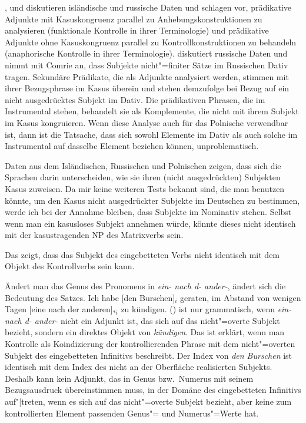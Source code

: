{%
% 
        \citet{Andrews82b}, \citet{Neidle82a} und 
        \citet[]{Bresnan82c} diskutieren isländische und
        russische Daten und schlagen vor, prädikative Adjunkte mit Kasuskongruenz
        parallel zu Anhebungskonstruktionen zu analysieren (funktionale Kontrolle
        in ihrer Terminologie) und prädikative Adjunkte ohne Kasuskongruenz parallel zu
        Kontrollkonstruktionen zu behandeln (anaphorische Kontrolle
        in ihrer Terminologie).
        \citet[]{Neidle82a} diskutiert russische Daten und nimmt mit Comrie
        an, dass Subjekte nicht"=finiter Sätze im Russischen Dativ tragen. Sekundäre Prädikate,
        die als Adjunkte analysiert werden, stimmen mit ihrer Bezugsphrase im Kasus überein und
        stehen demzufolge bei Bezug auf ein nicht ausgedrücktes Subjekt im Dativ. Die prädikativen
        Phrasen, die im Instrumental stehen, behandelt sie als Komplemente, die nicht mit
        ihrem Subjekt im Kasus kongruieren. Wenn diese Analyse auch für das Polnische verwendbar
        ist, dann ist die Tatsache, dass sich sowohl Elemente im Dativ als auch solche im Instrumental
        auf dasselbe Element beziehen können, unproblematisch.

        Daten aus dem Isländischen, Russischen und Polnischen zeigen, dass sich die Sprachen darin unterscheiden, wie sie
        ihren (nicht ausgedrückten) Subjekten Kasus zuweisen. Da mir keine weiteren
        Tests bekannt sind, die man benutzen könnte, um den Kasus nicht ausgedrückter Subjekte
        im Deutschen zu bestimmen, werde ich bei der Annahme bleiben, dass Subjekte im Nominativ
        stehen.
        Selbst wenn man ein kasusloses Subjekt annehmen würde, könnte dieses nicht identisch
        mit der kasustragenden NP des Matrixverbs sein.
}
Das zeigt, dass das Subjekt des eingebetteten Verbs nicht identisch mit dem Objekt des Kontrollverbs
sein kann.

Ändert man das Genus des Pronomens in {\em ein- nach d- ander-}, ändert sich die Bedeutung des Satzes.
\ea
Ich habe [den Burschen]$_i$ geraten, im Abstand von wenigen Tagen [eine nach der an\-de\-ren]$_{*i}$ zu kündigen.
\z
() ist nur grammatisch, wenn {\em ein- nach d- ander-} nicht ein Adjunkt ist, das 
sich auf das nicht"=overte Subjekt bezieht, sondern ein direktes Objekt von \emph{kündigen}.
Das ist erklärt, wenn man Kontrolle als Koindizierung der kontrollierenden Phrase mit dem nicht"=overten
Subjekt des eingebetteten Infinitivs beschreibt. Der Index von \emph{den Burschen} ist identisch
mit dem Index des nicht an der Oberfläche realisierten Subjekts. Deshalb kann kein Adjunkt,
das
in Genus bzw.\ Numerus mit seinem Bezugsausdruck übereinstimmen muss, in der Domäne
des eingebetteten Infinitivs auf"|treten, wenn es sich auf das nicht"=overte Subjekt bezieht,
aber keine zum kontrollierten Element passenden Genus"= und Numerus"=Werte hat.%

